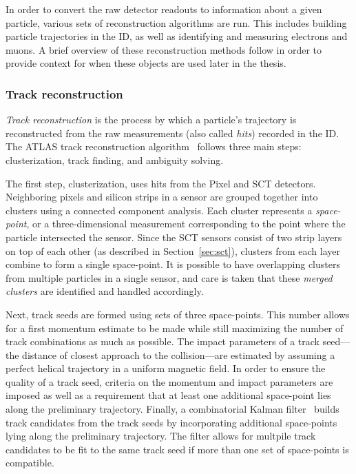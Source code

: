 In order to convert the raw detector readouts to information about a given particle, various sets of reconstruction algorithms are run.
This includes building particle trajectories in the ID, as well as identifying and measuring electrons and muons. %
A brief overview of these reconstruction methods follow in order to provide context for when these objects are used later in the thesis.

\subsubsection{Track reconstruction}\label{detector:track_reconstruction}
\emph{Track reconstruction} is the process by which a particle's trajectory is reconstructed from the raw measurements (also called \emph{hits}) recorded in the ID.
The ATLAS track reconstruction algorithm~\cite{2017.atlas-track-reconstruction-run2} follows three main steps: clusterization, track finding, and ambiguity solving.

The first step, clusterization, uses hits from the Pixel and SCT detectors.
Neighboring pixels and silicon strips in a sensor are grouped together into clusters using a connected component analysis.
Each cluster represents a \emph{space-point}, or a three-dimensional measurement corresponding to the point where the particle intersected the sensor.
Since the SCT sensors consist of two strip layers on top of each other (as described in Section~\ref{sec:sct}), clusters from each layer combine to form a single space-point.
It is possible to have overlapping clusters from multiple particles in a single sensor, and care is taken that these \emph{merged clusters} are identified and handled accordingly.

Next, track seeds are formed using sets of three space-points.
This number allows for a first momentum estimate to be made while still maximizing the number of track combinations as much as possible.
The impact parameters of a track seed---the distance of closest approach to the collision---are estimated by assuming a perfect helical trajectory in a uniform magnetic field.
In order to ensure the quality of a track seed, criteria on the momentum and impact parameters are imposed as well as a requirement that at least one additional space-point lies along the preliminary trajectory.
Finally, a combinatorial Kalman filter~\cite{1987.kalman-filtering} builds track candidates from the track seeds by incorporating additional space-points lying along the preliminary trajectory.
The filter allows for multpile track candidates to be fit to the same track seed if more than one set of space-points is compatible.

